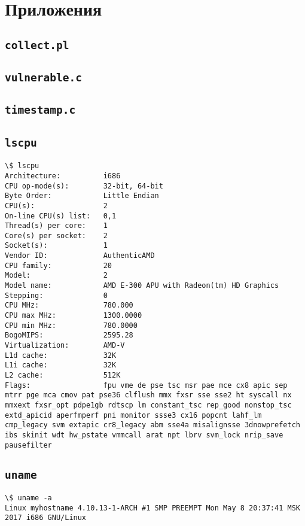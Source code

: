 \section{Приложения}

\subsection{ \texttt{collect.pl} }
\label{app:collect}


\subsection{ \texttt{vulnerable.c} }
\label{app:vuln}


\subsection{ \texttt{timestamp.c} }
\label{app:timestamp}


\subsection{ \texttt{lscpu} }
\label{app:lscpu}
\begin{lstlisting}
\$ lscpu
Architecture:          i686
CPU op-mode(s):        32-bit, 64-bit
Byte Order:            Little Endian
CPU(s):                2
On-line CPU(s) list:   0,1
Thread(s) per core:    1
Core(s) per socket:    2
Socket(s):             1
Vendor ID:             AuthenticAMD
CPU family:            20
Model:                 2
Model name:            AMD E-300 APU with Radeon(tm) HD Graphics
Stepping:              0
CPU MHz:               780.000
CPU max MHz:           1300.0000
CPU min MHz:           780.0000
BogoMIPS:              2595.28
Virtualization:        AMD-V
L1d cache:             32K
L1i cache:             32K
L2 cache:              512K
Flags:                 fpu vme de pse tsc msr pae mce cx8 apic sep mtrr pge mca cmov pat pse36 clflush mmx fxsr sse sse2 ht syscall nx mmxext fxsr_opt pdpe1gb rdtscp lm constant_tsc rep_good nonstop_tsc extd_apicid aperfmperf pni monitor ssse3 cx16 popcnt lahf_lm cmp_legacy svm extapic cr8_legacy abm sse4a misalignsse 3dnowprefetch ibs skinit wdt hw_pstate vmmcall arat npt lbrv svm_lock nrip_save pausefilter
\end{lstlisting}

\subsection{ \texttt{uname} }
\label{app:uname}
\begin{lstlisting}
\$ uname -a
Linux myhostname 4.10.13-1-ARCH #1 SMP PREEMPT Mon May 8 20:37:41 MSK 2017 i686 GNU/Linux
\end{lstlisting}

\clearpage

